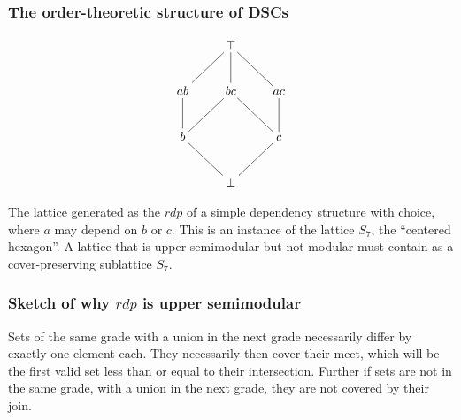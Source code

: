 \documentclass{beamer}
\begin{document}
\begin{frame}
\frametitle{The order-theoretic structure of DSCs}
\begin{figure}
\begin{minipage}[c]{0.3\textwidth}
\begin{equation*}
    \xymatrix{& \top \ar@{-}[dl] \ar@{-}[d] \ar@{-}[dr] & \\
      ab \ar@{-}[d]& bc \ar@{-}[dl] \ar@{-}[dr] &
        ac \ar@{-}[d]  \\
        b \ar@{-}[dr]  & & c \ar@{-}[dl] \\
        & \bot &
        } 
\end{equation*}
\end{minipage}
\end{figure}

The lattice generated as the \(rdp\) of a simple dependency structure with choice, where \(a\) may depend on \(b\) or \(c\). This is an instance of the lattice \(S_7\), the ``centered hexagon''. A lattice that is upper semimodular but not modular must contain as a cover-preserving sublattice \(S_7\).
\end{frame}

\begin{frame}[fragile]
\frametitle{Sketch of why \(rdp\) is upper semimodular}
\begin{figure}
\end{figure}
Sets of the same grade with a union in the next grade necessarily differ by exactly one element each. They necessarily then cover their meet, which will be the first valid set less than or equal to their intersection. Further if sets are not in the same grade, with a union in the next grade, they are not covered by their join.
\end{frame}
\end{document}
